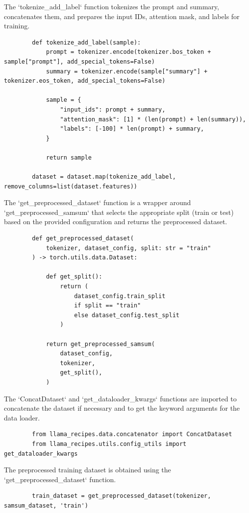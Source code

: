 \documentclass{solutionclass} %
\begin{document}
\begin{solution}
	The `tokenize\_add\_label` function tokenizes the prompt and summary, concatenates them, and prepares the input IDs, attention mask, and labels for training.
	\begin{lstlisting}
		def tokenize_add_label(sample):
			prompt = tokenizer.encode(tokenizer.bos_token + sample["prompt"], add_special_tokens=False)
			summary = tokenizer.encode(sample["summary"] + tokenizer.eos_token, add_special_tokens=False)
		
			sample = {
				"input_ids": prompt + summary,
				"attention_mask": [1] * (len(prompt) + len(summary)),
				"labels": [-100] * len(prompt) + summary,
			}
		
			return sample
		
		dataset = dataset.map(tokenize_add_label, remove_columns=list(dataset.features))
		\end{lstlisting}
\end{solution}

\begin{solution}
	The `get\_preprocessed\_dataset` function is a wrapper around `get\_preprocessed\_samsum` that selects the appropriate split (train or test) based on the provided configuration and returns the preprocessed dataset.
	\begin{lstlisting}
		def get_preprocessed_dataset(
			tokenizer, dataset_config, split: str = "train"
		) -> torch.utils.data.Dataset:
		
			def get_split():
				return (
					dataset_config.train_split
					if split == "train"
					else dataset_config.test_split
				)
		
			return get_preprocessed_samsum(
				dataset_config,
				tokenizer,
				get_split(),
			)
		\end{lstlisting}
\end{solution}

\begin{solution}
	The `ConcatDataset` and `get\_dataloader\_kwargs` functions are imported to concatenate the dataset if necessary and to get the keyword arguments for the data loader.
	\begin{lstlisting}
		from llama_recipes.data.concatenator import ConcatDataset
		from llama_recipes.utils.config_utils import get_dataloader_kwargs
	\end{lstlisting}
\end{solution}

\begin{solution}
	The preprocessed training dataset is obtained using the `get\_preprocessed\_dataset` function.
	\begin{lstlisting}
		train_dataset = get_preprocessed_dataset(tokenizer, samsum_dataset, 'train')
	\end{lstlisting}
\end{solution}
\end{document}
